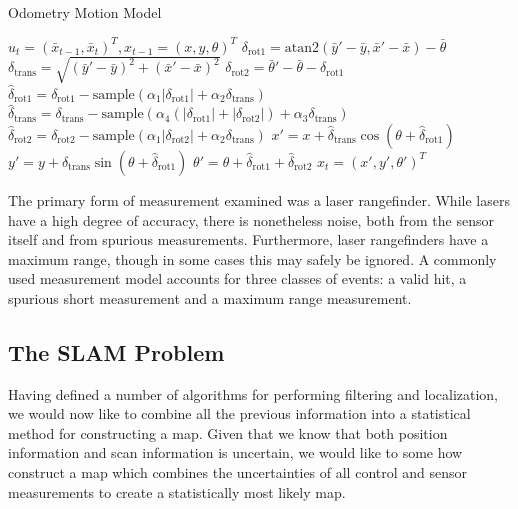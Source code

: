 \documentclass[english]{article}
\begin{document}
\begin{algorithm}
\caption{Odometry Motion Model}
\label{alg:odometry_model}
\begin{algorithmic}
	\REQUIRE $u_t = (\bar{x}_{t-1},\bar{x}_t)^T, x_{t-1} = (x, y, \theta)^T$
        \STATE $\delta_{\mathrm{rot1}} = \mathrm{atan2}(\bar{y}' - \bar{y}, \bar{x}' - \bar{x}) - \bar{\theta}$
        \STATE $\delta_{\mathrm{trans}} = \sqrt{(\bar{y}' - \bar{y})^2 + (\bar{x}' - \bar{x})^2}$
        \STATE $\delta_{\mathrm{rot2}} = \bar{\theta}' - \bar{\theta} - \delta_{\mathrm{rot1}}$
        \STATE $\hat{\delta}_{\mathrm{rot1}} = \delta_{\mathrm{rot1}} - \textrm{sample}(\alpha_1|\delta_{\mathrm{rot1}}| + \alpha_2\delta_{\mathrm{trans}})$
        \STATE $\hat{\delta}_{\mathrm{trans}} = \delta_{\mathrm{trans}} - \textrm{sample}(\alpha_4(|\delta_{\mathrm{rot1}}| + |\delta_{\mathrm{rot2}}|)+ \alpha_3\delta_{\mathrm{trans}})$
        \STATE $\hat{\delta}_{\mathrm{rot2}} = \delta_{\mathrm{rot2}} - \textrm{sample}(\alpha_1|\delta_{\mathrm{rot2}}| + \alpha_2\delta_{\mathrm{trans}})$
        \STATE $x' = x + \hat{\delta}_{\mathrm{trans}}\cos{(\theta + \hat{\delta}_{\mathrm{rot1}})} $
        \STATE $y' = y + \hat{\delta}_{\mathrm{trans}}\sin{(\theta + \hat{\delta}_{\mathrm{rot1}})} $
        \STATE $\theta' = \theta + \hat{\delta}_{\mathrm{rot1}} + \hat{\delta}_{\mathrm{rot2}}$
        \RETURN $x_t = (x', y', \theta')^T$
\end{algorithmic}
\end{algorithm}

The primary form of measurement examined was a laser rangefinder. While lasers have a high degree of accuracy, there is nonetheless noise, both from the sensor itself and from spurious measurements. Furthermore, laser rangefinders have a maximum range, though in some cases this may safely be ignored. A commonly used measurement model accounts for three classes of events: a valid hit, a spurious short measurement and a maximum range measurement.




\subsection{The SLAM Problem}
Having defined a number of algorithms for performing filtering and localization, we would now like to combine all the previous information into a statistical method for constructing a map. Given that we know that both position information and scan information is uncertain, we would like to some how construct a map which combines the uncertainties of all control and sensor measurements to create a statistically most likely map.
\end{document}
